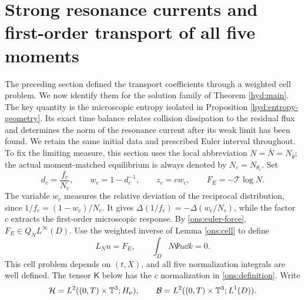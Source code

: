 \section{Strong resonance currents and first-order transport of all five moments}
\label{cur:section}

The preceding section defined the transport coefficients through a weighted
cell problem. We now identify them for the solution family of
Theorem \ref{hyd:main}. The key quantity is the microscopic entropy
isolated in Proposition \ref{hyd:entropy-geometry}. Its exact time balance
relates collision dissipation to the residual flux and determines the
norm of the resonance current after its weak limit has been found.
We retain the same initial data and prescribed Euler interval throughout.
To fix the limiting measure, this section uses the local abbreviation
$N=\bar N=N_{\bar\theta}$; the actual moment-matched equilibrium is
always denoted by $N_c=N_{\theta_c}$. Set
\begin{equation}\label{cur:variables}
 d_c=\frac{f_c}{N_c},\qquad w_c=1-d_c^{-1},\qquad
 z_c=cw_c,\qquad F_E=-\mathcal T\log N.
\end{equation}
The variable $w_c$ measures the relative deviation of the reciprocal
distribution, since $1/f_c=(1-w_c)/N_c$. It gives
$\Delta(1/f_c)=-\Delta(w_c/N_c)$, while the factor $c$ extracts the
first-order microscopic response.
By \eqref{ons:euler-force}, $F_E\in Q_NL^\infty(D)$.
Use the weighted inverse of Lemma \ref{ons:cell} to define
\begin{equation}\label{cur:limitcell}
 L_Nu=F_E,\qquad \int_D N\Psi u\dd k=0.
\end{equation}
This cell problem depends on $(t,X)$, and all five normalization
integrals are well defined. The tensor $\mathsf K$ below has the
$c$ normalization in \eqref{ons:definition}. Write
\[
 \mathcal H=L^2((0,T)\times\mathbb T^3;H_\nu),\qquad
 \mathcal B=L^2((0,T)\times\mathbb T^3;L^1(D)).
\]

